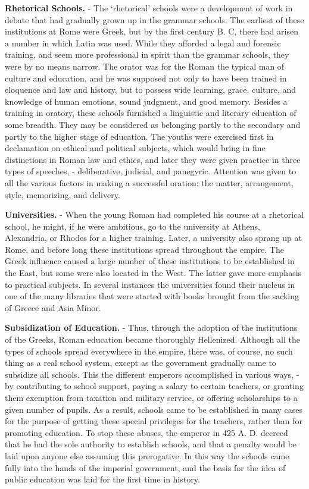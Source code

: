 \documentclass[
]{book}
\begin{document}
\textbf{Rhetorical Schools.} - The `rhetorical' schools were a development of work in debate that had gradually grown up in the grammar schools. The earliest of these institutions at Rome were Greek, but by the first century B. C, there had arisen a number in which Latin was used. While they afforded a legal and forensic training, and seem more professional in spirit than the grammar schools, they were by no means narrow. The orator was for the Roman the typical man of culture and education, and he was supposed not only to have been trained in eloquence and law and history, but to possess wide learning, grace, culture, and knowledge of human emotions, sound judgment, and good memory. Besides a training in oratory, these schools furnished a linguistic and literary education of some breadth. They may be considered as belonging partly to the secondary and partly to the higher stage of education. The youths were exercised first in declamation on ethical and political subjects, which would bring in fine distinctions in Roman law and ethics, and later they were given practice in three types of speeches, - deliberative, judicial, and panegyric. Attention was given to all the various factors in making a successful oration: the matter, arrangement, style, memorizing, and delivery.

\textbf{Universities.} - When the young Roman had completed his course at a rhetorical school, he might, if he were ambitious, go to the university at Athens, Alexandria, or Rhodes for a higher training. Later, a university also sprang up at Rome, and before long these institutions spread throughout the empire. The Greek influence caused a large number of these institutions to be established in the East, but some were also located in the West. The latter gave more emphasis to practical subjects. In several instances the universities found their nucleus in one of the many libraries that were started with books brought from the sacking of Greece and Asia Minor.

\textbf{Subsidization of Education.} - Thus, through the adoption of the institutions of the Greeks, Roman education became thoroughly Hellenized. Although all the types of schools spread everywhere in the empire, there was, of course, no such thing as a real school system, except as the government gradually came to subsidize all schools. This the different emperors accomplished in various ways, - by contributing to school support, paying a salary to certain teachers, or granting them exemption from taxation and military service, or offering scholarships to a given number of pupils. As a result, schools came to be established in many cases for the purpose of getting these special privileges for the teachers, rather than for promoting education. To stop these abuses, the emperor in 425 A. D. decreed that he had the sole authority to establish schools, and that a penalty would be laid upon anyone else assuming this prerogative. In this way the schools came fully into the hands of the imperial government, and the basis for the idea of public education was laid for the first time in history.
\end{document}
